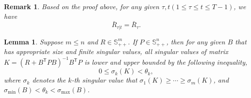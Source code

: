 \documentclass{article}
\newcommand{\transpose}{\mathsf{T}}
\newtheorem{lemma}{Lemma}
\newtheorem{remark}{Remark}
\begin{document}
\begin{remark}
    Based on the proof above, for any given $\tau,t(1\leq \tau \leq t \leq T-1)$, we have
    \begin{equation*}
        \bar{R}_{\tau|t} = \bar{R}_{\tau}.
    \end{equation*}
\end{remark}

\begin{lemma}\label{lemma:matrixK}
    Suppose $m \leq n$ and $R\in \mathbb{S}^{m}_{++}$. 
    If $P\in \mathbb{S}^{n}_{++}$, then for any given $B$ that has appropriate size and finite singular values, all singular values of matrix $K = (R+B^{\transpose}PB)^{-1}B^{\transpose}P$ is lower and upper bounded by the following inequality,
    \begin{equation}
        0 \leq \sigma_{k}(K) < \theta_{k},
    \end{equation}
    where $\sigma_{k}$ denotes the $k$-th singular value that $\sigma_{1}(K) \geq \cdots \geq \sigma_{m}(K)$, and $\sigma_{\min}(B) < \theta_{k} <\sigma_{\max}(B)$.
\end{lemma}
\end{document}
